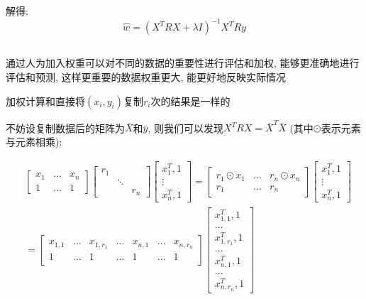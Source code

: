 \documentclass[12pt, a4paper]{article}
\begin{document}
解得:
\begin{equation*}
    \hat{w} = (X^T R X + \lambda I)^{-1} X^T R y
\end{equation*}

\subsection{}

通过人为加入权重可以对不同的数据的重要性进行评估和加权, 能够更准确地进行评估和预测, 
这样更重要的数据权重更大, 能更好地反映实际情况

加权计算和直接将$(x_i,y_i)$复制$r_i$次的结果是一样的

不妨设复制数据后的矩阵为$\bar{X}$和$\bar{y}$, 则我们可以发现$X^TRX = \bar{X}^T \bar{X}$
(其中$\odot$表示元素与元素相乘):

\begin{align*}
    &\begin{bmatrix}
        x_1 & \dots & x_n\\
        1 & \dots & 1
    \end{bmatrix}
    \begin{bmatrix}
        r_1 &  & \\
        & \ddots & \\
        & & r_n
    \end{bmatrix}
    \begin{bmatrix}
        x_1^T, 1\\
        \vdots\\
        x_n^T, 1
    \end{bmatrix} 
    =
    \begin{bmatrix}
        r_1 \odot  x_1 & \dots & r_n \odot x_n\\
        r_1 & \dots & r_n
    \end{bmatrix}
    \begin{bmatrix}
        x_1^T, 1\\
        \vdots\\
        x_n^T, 1
    \end{bmatrix}
    \\&= 
    \begin{bmatrix}
        x_{1,1} & \dots & x_{1,r_1} & \dots & x_{n,1} & \dots & x_{n,r_n}\\
        1 & \dots & 1 & \dots & 1 & \dots & 1
    \end{bmatrix}
    \begin{bmatrix}
        x_{1,1}^T,1\\
        \dots\\
        x_{1,r_1}^T,1\\
        \dots\\
        x_{n,1}^T,1\\
        \dots\\
        x_{n,r_n}^T,1
    \end{bmatrix}
\end{align*}
\end{document}
